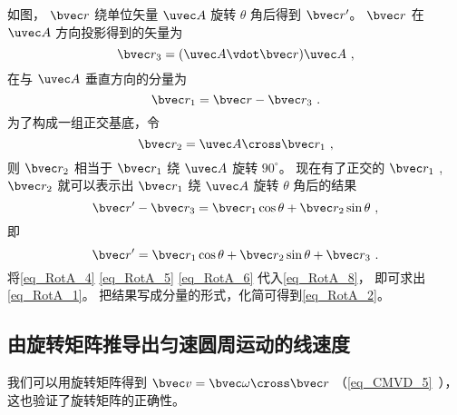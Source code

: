 如图， $\bvec r$ 绕单位矢量 $\uvec A$ 旋转 $\theta$ 角后得到 $\bvec r'$。  $\bvec r$ 在 $\uvec A$ 方向投影得到的矢量为
\begin{equation}\label{eq_RotA_4}
\bvec r_3 = (\uvec A \vdot \bvec r)\uvec A~,
\end{equation}
在与 $\uvec A$ 垂直方向的分量为
\begin{equation}\label{eq_RotA_5}
\bvec r_1 = \bvec r - \bvec r_3~.
\end{equation}
为了构成一组正交基底，令
\begin{equation}\label{eq_RotA_6}
\bvec r_2 = \uvec A \cross \bvec r_1~,
\end{equation}
则 $\bvec r_2$ 相当于 $\bvec r_1$ 绕 $\uvec A$ 旋转 $90^\circ$。 现在有了正交的 $\bvec r_1$ , $\bvec r_2$  就可以表示出 $\bvec r_1$ 绕 $\uvec A$ 旋转 $\theta$ 角后的结果
\begin{equation}
\bvec r' - \bvec r_3 = \bvec r_1\cos \theta  + \bvec r_2\sin \theta~,
\end{equation}
即
\begin{equation}\label{eq_RotA_8}
\bvec r' = \bvec r_1\cos \theta  + \bvec r_2\sin \theta  + \bvec r_3~.
\end{equation} 
将\autoref{eq_RotA_4} \autoref{eq_RotA_5} \autoref{eq_RotA_6} 代入\autoref{eq_RotA_8}， 即可求出\autoref{eq_RotA_1}。 把结果写成分量的形式，化简可得到\autoref{eq_RotA_2}。

\subsection{由旋转矩阵推导出匀速圆周运动的线速度} 

我们可以用旋转矩阵得到 $\bvec v = \bvec \omega  \cross \bvec r$ （\autoref{eq_CMVD_5}~）， 这也验证了旋转矩阵的正确性。


